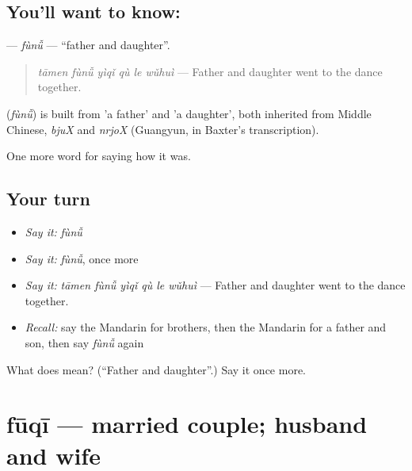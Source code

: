 \subsection*{You'll want to know: }
\textbf{} — \emph{fùnǚ} — \textquotedblleft{}father and daughter\textquotedblright{}.

\begin{quote}
\textbf{} \emph{tāmen fùnǚ yìqǐ qù le wǔhuì} — Father and daughter went to the dance together.
\end{quote}

\begin{cousinweb}
\textbf{} (\emph{fùnǚ}) is built from  'a father' and  'a daughter', both inherited from Middle Chinese, \emph{bjuX} and \emph{nrjoX} (Guangyun, in Baxter's transcription).
\end{cousinweb}

\begin{grammarlens}[title={What you've built}]
One more word for saying how it was.
\end{grammarlens}

\subsection*{Your turn}
\begin{itemize}
\raggedright
  \item \emph{Say it:} \emph{fùnǚ}
  \item \emph{Say it:} \emph{fùnǚ}, once more
  \item \emph{Say it:} \emph{tāmen fùnǚ yìqǐ qù le wǔhuì} — Father and daughter went to the dance together.
  \item \emph{Recall:} say the Mandarin for brothers, then the Mandarin for a father and son, then say \emph{fùnǚ} again
\end{itemize}

\begin{tcolorbox}[breakable,colback=teal!4,colframe=teal!35!black,title={Before you move on}]
What does  mean? (\textquotedblleft{}Father and daughter\textquotedblright{}.) Say it once more.
\end{tcolorbox}
\section[fūqī]{fūqī — married couple; husband and wife}

\label{lesson:ZH-C507-fuqi}



